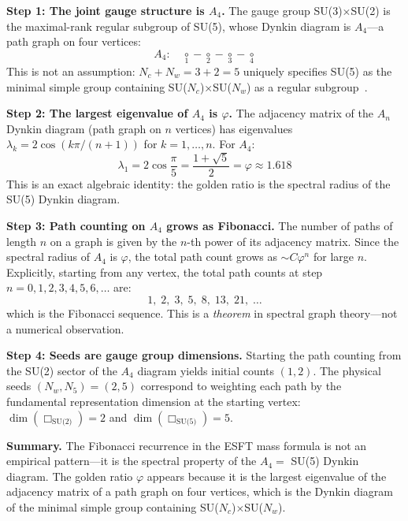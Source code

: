 ﻿\documentclass[twocolumn,preprintnumbers,amsmath,amssymb,prd]{revtex4-2}
\begin{document}
\textbf{Step 1: The joint gauge structure is $A_4$.}
The gauge group SU(3)$\times$SU(2) is the maximal-rank regular subgroup of SU(5), whose Dynkin diagram is $A_4$---a path graph on four vertices:
\begin{equation}
A_4: \quad \underset{1}{\circ} - \underset{2}{\circ} - \underset{3}{\circ} - \underset{4}{\circ}
\end{equation}
This is not an assumption: $N_c + N_w = 3 + 2 = 5$ uniquely specifies SU(5) as the minimal simple group containing SU($N_c$)$\times$SU($N_w$) as a regular subgroup~\cite{Georgi1974}.

\textbf{Step 2: The largest eigenvalue of $A_4$ is $\varphi$.}
The adjacency matrix of the $A_n$ Dynkin diagram (path graph on $n$ vertices) has eigenvalues $\lambda_k = 2\cos(k\pi/(n+1))$ for $k = 1, \ldots, n$. For $A_4$:
\begin{equation}
\lambda_1 = 2\cos\frac{\pi}{5} = \frac{1+\sqrt{5}}{2} = \varphi \approx 1.618
\label{eq:A4_eigenvalue}
\end{equation}
This is an exact algebraic identity: the golden ratio is the spectral radius of the SU(5) Dynkin diagram.

\textbf{Step 3: Path counting on $A_4$ grows as Fibonacci.}
The number of paths of length $n$ on a graph is given by the $n$-th power of its adjacency matrix. Since the spectral radius of $A_4$ is $\varphi$, the total path count grows as $\sim C \varphi^n$ for large $n$. Explicitly, starting from any vertex, the total path counts at step $n = 0, 1, 2, 3, 4, 5, 6, \ldots$ are:
\begin{equation}
1, \; 2, \; 3, \; 5, \; 8, \; 13, \; 21, \; \ldots
\end{equation}
which is the Fibonacci sequence. This is a \emph{theorem} in spectral graph theory---not a numerical observation.

\textbf{Step 4: Seeds are gauge group dimensions.}
Starting the path counting from the SU(2) sector of the $A_4$ diagram yields initial counts $(1, 2)$. The physical seeds $(N_w, N_5) = (2, 5)$ correspond to weighting each path by the fundamental representation dimension at the starting vertex: $\dim(\Box_{\text{SU(2)}}) = 2$ and $\dim(\Box_{\text{SU(5)}}) = 5$.

\textbf{Summary.} The Fibonacci recurrence in the ESFT mass formula is not an empirical pattern---it is the spectral property of the $A_4 = $ SU(5) Dynkin diagram. The golden ratio $\varphi$ appears because it is the largest eigenvalue of the adjacency matrix of a path graph on four vertices, which is the Dynkin diagram of the minimal simple group containing SU($N_c$)$\times$SU($N_w$).
\end{document}
